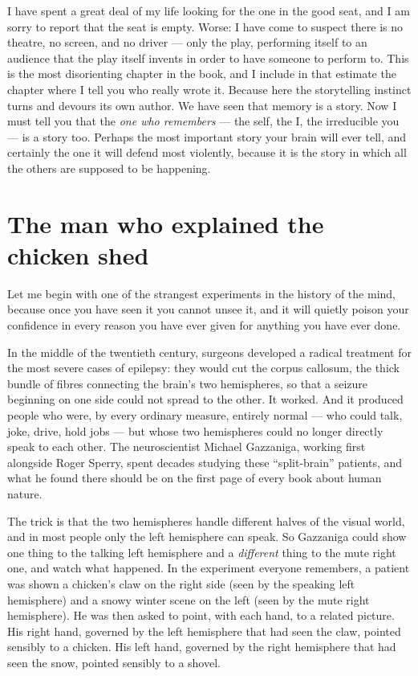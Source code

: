 I have spent a great deal of my life looking for the one in the good seat, and I am sorry to report that the seat is empty. Worse: I have come to suspect there is no theatre, no screen, and no driver — only the play, performing itself to an audience that the play itself invents in order to have someone to perform to. This is the most disorienting chapter in the book, and I include in that estimate the chapter where I tell you who really wrote it. Because here the storytelling instinct turns and devours its own author. We have seen that memory is a story. Now I must tell you that the \emph{one who remembers} — the self, the I, the irreducible you — is a story too. Perhaps the most important story your brain will ever tell, and certainly the one it will defend most violently, because it is the story in which all the others are supposed to be happening.

\section*{The man who explained the chicken shed}

Let me begin with one of the strangest experiments in the history of the mind, because once you have seen it you cannot unsee it, and it will quietly poison your confidence in every reason you have ever given for anything you have ever done.

In the middle of the twentieth century, surgeons developed a radical treatment for the most severe cases of epilepsy: they would cut the corpus callosum, the thick bundle of fibres connecting the brain's two hemispheres, so that a seizure beginning on one side could not spread to the other. It worked. And it produced people who were, by every ordinary measure, entirely normal — who could talk, joke, drive, hold jobs — but whose two hemispheres could no longer directly speak to each other. The neuroscientist Michael Gazzaniga, working first alongside Roger Sperry, spent decades studying these ``split-brain'' patients, and what he found there should be on the first page of every book about human nature.

The trick is that the two hemispheres handle different halves of the visual world, and in most people only the left hemisphere can speak. So Gazzaniga could show one thing to the talking left hemisphere and a \emph{different} thing to the mute right one, and watch what happened. In the experiment everyone remembers, a patient was shown a chicken's claw on the right side (seen by the speaking left hemisphere) and a snowy winter scene on the left (seen by the mute right hemisphere). He was then asked to point, with each hand, to a related picture. His right hand, governed by the left hemisphere that had seen the claw, pointed sensibly to a chicken. His left hand, governed by the right hemisphere that had seen the snow, pointed sensibly to a shovel.

